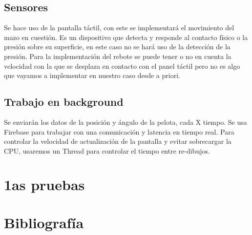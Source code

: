 \documentclass[a4paper,openright,12pt]{article}
\begin{document}
\subsection{Sensores}
Se hace uso de la pantalla táctil, con este se implementará el movimiento del mazo en cuestión. Es un dispositivo que detecta y responde al contacto físico o la presión sobre su superficie, en este caso no se hará uso de la detección de la presión. Para la implementación del rebote se puede tener o no en cuenta la velocidad con la que se desplaza en contacto con el panel táctil pero no es algo que vayamos a implementar en nuestro caso desde a priori.
\subsection{Trabajo en background}
Se enviarán los datos de la posición y ángulo de la pelota, cada X tiempo. Se usa Firebase para trabajar con una comunicación y latencia en tiempo real. Para controlar la velocidad de actualización de la pantalla y evitar sobrecargar la CPU, usaremos un Thread para controlar el tiempo entre re-dibujos.
\\

\section{1as pruebas}


\section{Bibliografía}


\end{document}
